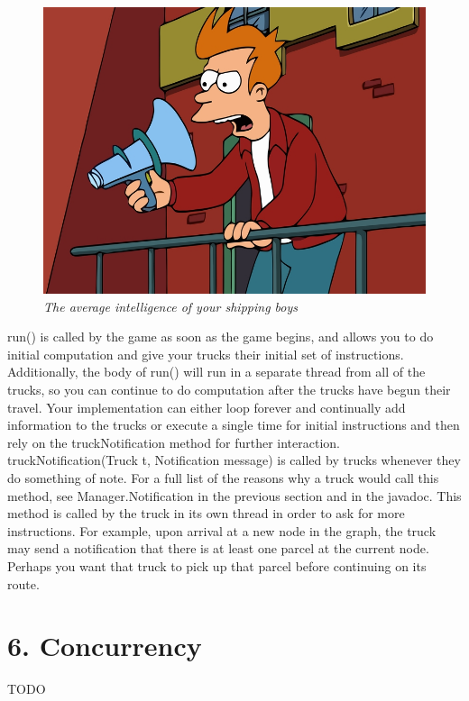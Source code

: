 \documentclass[11pt]{article}
\begin{document}
\begin{figure}[h]
\centerline{\includegraphics[scale=0.4]{fry.jpg}} 
\caption{\em{The average intelligence of your shipping boys}}
\end{figure}

run() is called by the game as soon as the game begins, and allows you to do initial computation and give your trucks their initial set of instructions. Additionally, the body of run() will run in a separate thread from all of the trucks, so you can continue to do computation after the trucks have begun their travel. Your implementation can either loop forever and continually add information to the trucks or execute a single time for initial instructions and then rely on the truckNotification method for further interaction.\\

truckNotification(Truck t, Notification message) is called by trucks whenever they do something of note. For a full list of the reasons why a truck would call this method, see Manager.Notification in the previous section and in the javadoc. This method is called by the truck in its own thread in order to ask for more instructions. For example, upon arrival at a new node in the graph, the truck may send a notification that there is at least one parcel at the current node. Perhaps you want that truck to pick up that parcel before continuing on its route.

\newpage
\section{6. Concurrency}
TODO
\end{document}
